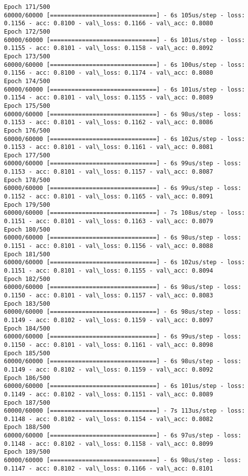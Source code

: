 \documentclass[11pt]{article}
\begin{document}
\begin{Verbatim}[commandchars=\\\{\}]
Epoch 171/500
60000/60000 [==============================] - 6s 105us/step - loss: 0.1156 - acc: 0.8100 - val\_loss: 0.1166 - val\_acc: 0.8080
Epoch 172/500
60000/60000 [==============================] - 6s 101us/step - loss: 0.1155 - acc: 0.8101 - val\_loss: 0.1158 - val\_acc: 0.8092
Epoch 173/500
60000/60000 [==============================] - 6s 100us/step - loss: 0.1156 - acc: 0.8100 - val\_loss: 0.1174 - val\_acc: 0.8080
Epoch 174/500
60000/60000 [==============================] - 6s 101us/step - loss: 0.1154 - acc: 0.8101 - val\_loss: 0.1155 - val\_acc: 0.8089
Epoch 175/500
60000/60000 [==============================] - 6s 98us/step - loss: 0.1153 - acc: 0.8101 - val\_loss: 0.1162 - val\_acc: 0.8086
Epoch 176/500
60000/60000 [==============================] - 6s 102us/step - loss: 0.1153 - acc: 0.8101 - val\_loss: 0.1161 - val\_acc: 0.8081
Epoch 177/500
60000/60000 [==============================] - 6s 99us/step - loss: 0.1153 - acc: 0.8101 - val\_loss: 0.1157 - val\_acc: 0.8087
Epoch 178/500
60000/60000 [==============================] - 6s 99us/step - loss: 0.1152 - acc: 0.8101 - val\_loss: 0.1165 - val\_acc: 0.8091
Epoch 179/500
60000/60000 [==============================] - 7s 108us/step - loss: 0.1151 - acc: 0.8101 - val\_loss: 0.1163 - val\_acc: 0.8079
Epoch 180/500
60000/60000 [==============================] - 6s 98us/step - loss: 0.1151 - acc: 0.8101 - val\_loss: 0.1156 - val\_acc: 0.8088
Epoch 181/500
60000/60000 [==============================] - 6s 102us/step - loss: 0.1151 - acc: 0.8101 - val\_loss: 0.1155 - val\_acc: 0.8094
Epoch 182/500
60000/60000 [==============================] - 6s 98us/step - loss: 0.1150 - acc: 0.8101 - val\_loss: 0.1157 - val\_acc: 0.8083
Epoch 183/500
60000/60000 [==============================] - 6s 98us/step - loss: 0.1149 - acc: 0.8102 - val\_loss: 0.1159 - val\_acc: 0.8097
Epoch 184/500
60000/60000 [==============================] - 6s 99us/step - loss: 0.1150 - acc: 0.8101 - val\_loss: 0.1161 - val\_acc: 0.8098
Epoch 185/500
60000/60000 [==============================] - 6s 98us/step - loss: 0.1149 - acc: 0.8102 - val\_loss: 0.1159 - val\_acc: 0.8092
Epoch 186/500
60000/60000 [==============================] - 6s 101us/step - loss: 0.1149 - acc: 0.8102 - val\_loss: 0.1151 - val\_acc: 0.8089
Epoch 187/500
60000/60000 [==============================] - 7s 113us/step - loss: 0.1148 - acc: 0.8102 - val\_loss: 0.1154 - val\_acc: 0.8082
Epoch 188/500
60000/60000 [==============================] - 6s 97us/step - loss: 0.1148 - acc: 0.8102 - val\_loss: 0.1158 - val\_acc: 0.8099
Epoch 189/500
60000/60000 [==============================] - 6s 98us/step - loss: 0.1147 - acc: 0.8102 - val\_loss: 0.1166 - val\_acc: 0.8101

\end{Verbatim}
\end{document}
